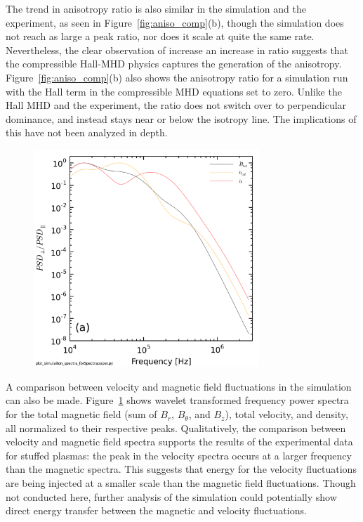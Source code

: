 \documentclass[aip,prl,amsmath,amssymb,reprint,superscriptaddress]{revtex4-1} %
\begin{document}
The trend in anisotropy ratio is also similar in the simulation and the experiment, as seen in Figure~\ref{fig:aniso_comp}(b), though the simulation does not reach as large a peak ratio, nor does it scale at quite the same rate. Nevertheless, the clear observation of increase an increase in ratio suggests that the compressible Hall-MHD physics captures the generation of the anisotropy. Figure~\ref{fig:aniso_comp}(b) also shows the anisotropy ratio for a simulation run with the Hall term in the compressible MHD equations set to zero. Unlike the Hall MHD and the experiment, the ratio does not switch over to perpendicular dominance, and instead stays near or below the isotropy line. The implications of this have not been analyzed in depth.

\begin{figure}[!htbp]
\centerline{
\includegraphics[width=8.5cm]{BfieldFlow_simulation_comparison}}
\caption{\label{fig:bflow_comp}}
\end{figure}

A comparison between velocity and magnetic field fluctuations in the simulation can also be made. Figure~\ref{fig:bflow_comp} shows wavelet transformed frequency power spectra for the total magnetic field (sum of $B_{r}$, $B_{\theta}$, and $B_{z}$), total velocity, and density, all normalized to their respective peaks. Qualitatively, the comparison between velocity and magnetic field spectra supports the results of the experimental data for stuffed plasmas: the peak in the velocity spectra occurs at a larger frequency than the magnetic spectra. This suggests that energy for the velocity fluctuations are being injected at a smaller scale than the magnetic field fluctuations. Though not conducted here, further analysis of the simulation could potentially show direct energy transfer between the magnetic and velocity fluctuations.
\end{document}
